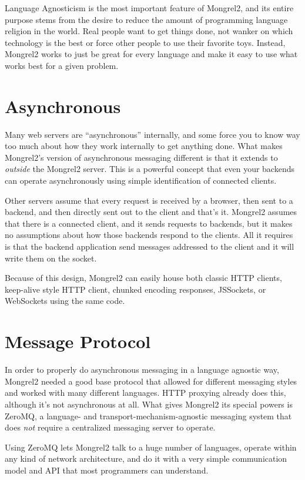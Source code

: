 Language Agnosticism is the most important feature of Mongrel2, and its entire
purpose stems from the desire to reduce the amount of programming language
religion in the world.  Real people want to get things done, not wanker on
which technology is the best or force other people to use their favorite toys.
Instead, Mongrel2 works to just be great for every language and make it easy
to use what works best for a given problem.


\section{Asynchronous}

Many web servers are ``asynchronous'' internally, and some force you to
know way too much about how they work internally to get anything done.  What makes
Mongrel2's version of asynchronous messaging different is that it extends to
\emph{outside} the Mongrel2 server.  This is a powerful concept that even your backends
can operate asynchronously using simple identification of connected clients.

Other servers assume that every request is received by a browser, then sent to a backend,
and then directly sent out to the client and that's it.  Mongrel2 assumes that there
is a connected client, and it sends requests to backends, but it makes no assumptions
about how those backends respond to the clients.  All it requires is that the backend
application send messages addressed to the client and it will write them on the
socket.

Because of this design, Mongrel2 can easily house both classic HTTP clients, keep-alive
style HTTP client, chunked encoding responses, JSSockets, or WebSockets using the same
code.


\section{Message Protocol}

In order to properly do asynchronous messaging in a language agnostic way, Mongrel2
needed a good base protocol that allowed for different messaging styles and worked
with many different languages.  HTTP proxying already does this, although it's not
asynchronous at all.  What gives Mongrel2 its special powers is ZeroMQ, a language-
and transport-mechanism-agnostic messaging system that does \emph{not} require a
centralized messaging server to operate.

Using ZeroMQ lets Mongrel2 talk to a huge number of languages, operate within any
kind of network architecture, and do it with a very simple communication model and
API that most programmers can understand.


